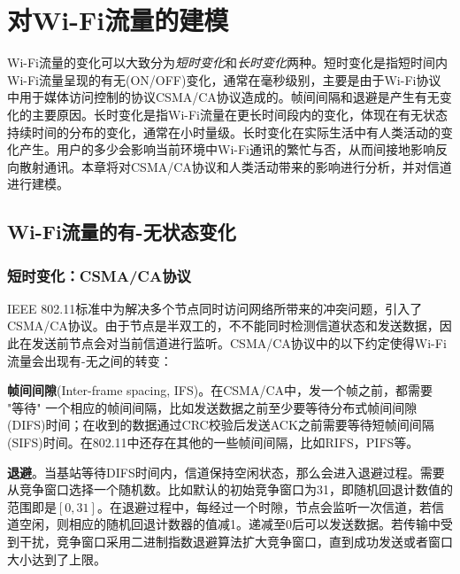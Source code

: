 
\chapter{对Wi-Fi流量的建模}
\label{chap:model}
Wi-Fi流量的变化可以大致分为\emph{短时变化}和\emph{长时变化}两种。短时变化是指短时间内Wi-Fi流量呈现的有无(ON/OFF)变化，通常在毫秒级别，主要是由于Wi-Fi协议中用于媒体访问控制的协议CSMA/CA协议造成的。帧间间隔和退避是产生有无变化的主要原因。长时变化是指Wi-Fi流量在更长时间段内的变化，体现在有无状态持续时间的分布的变化，通常在小时量级。长时变化在实际生活中有人类活动的变化产生。用户的多少会影响当前环境中Wi-Fi通讯的繁忙与否，从而间接地影响反向散射通讯。本章将对CSMA/CA协议和人类活动带来的影响进行分析，并对信道进行建模。
\section{Wi-Fi流量的有-无状态变化}
\subsection{短时变化：CSMA/CA协议}
IEEE 802.11标准中为解决多个节点同时访问网络所带来的冲突问题，引入了CSMA/CA协议。由于节点是半双工的，不不能同时检测信道状态和发送数据，因此在发送前节点会对当前信道进行监听。CSMA/CA协议中的以下约定使得Wi-Fi流量会出现有-无之间的转变：

\textbf{帧间间隙}(Inter-frame spacing, IFS)。在CSMA/CA中，发一个帧之前，都需要 "等待" 一个相应的帧间间隔，比如发送数据之前至少要等待分布式帧间间隙(DIFS)时间；在收到的数据通过CRC校验后发送ACK之前需要等待短帧间间隔(SIFS)时间。在802.11中还存在其他的一些帧间间隔，比如RIFS，PIFS等。

\textbf{退避}。当基站等待DIFS时间内，信道保持空闲状态，那么会进入退避过程。需要从竞争窗口选择一个随机数。比如默认的初始竞争窗口为31，即随机回退计数值的范围即是$[0,31]$。在退避过程中，每经过一个时隙，节点会监听一次信道，若信道空闲，则相应的随机回退计数器的值减1。递减至0后可以发送数据。若传输中受到干扰，竞争窗口采用二进制指数退避算法扩大竞争窗口，直到成功发送或者窗口大小达到了上限。

